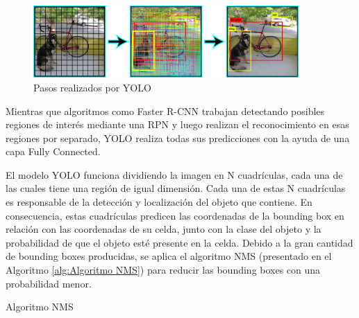 \begin{figure}[H]
    \centering
    \includegraphics[width=0.9\textwidth]{Book/figures/5_deteccion2d/yolo_example.png}
    \caption{Pasos realizados por YOLO}
    \label{fig:Pasos realizados por YOLO}
\end{figure}

Mientras que algoritmos como Faster R-CNN \cite{Faster_R-CNN} trabajan detectando posibles regiones de interés mediante una \ac{RPN} y luego realizan el reconocimiento en esas regiones por separado, \ac{YOLO} realiza todas sus predicciones con la ayuda de una capa Fully Connected.

El modelo \ac{YOLO} funciona dividiendo la imagen en N cuadrículas, cada una de las cuales tiene una región de igual dimensión. Cada una de estas N cuadrículas es responsable de la detección y localización del objeto que contiene. En consecuencia, estas cuadrículas predicen las coordenadas de la bounding box en relación con las coordenadas de su celda, junto con la clase del objeto y la probabilidad de que el objeto esté presente en la celda. Debido a la gran cantidad de bounding boxes producidas, se aplica el algoritmo \ac{NMS} (presentado en el Algoritmo \ref{alg:Algoritmo NMS}) para reducir las bounding boxes con una probabilidad menor.

\begin{algorithm}[H]
\caption{Algoritmo NMS}\label{alg:Algoritmo NMS}
\DontPrintSemicolon
\end{algorithm}

